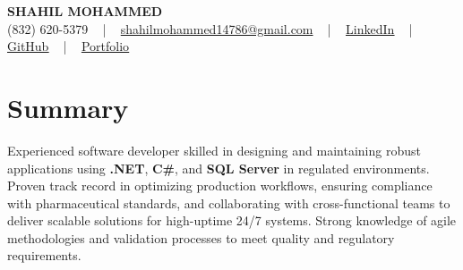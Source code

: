 \documentclass[letterpaper,10pt]{article}
\begin{document}
\begin{center}
    {\fontsize{14pt}{12pt}\selectfont \textbf{\MakeUppercase{Shahil Mohammed}}}\\ \vspace{2pt}
    \fontsize{10pt}{12pt}\selectfont (832) 620-5379 ~ | ~ \href{mailto:shahilmohammed14786@gmail.com}{shahilmohammed14786@gmail.com} ~ | ~  
    \href{https://www.linkedin.com/in/shahil-mohammed-9652931a1/}{\color{blue}\underline{LinkedIn}}  ~ | ~ 
    \href{https://github.com/freakbeast14}{\color{blue}\underline{GitHub}} ~ | ~ 
    \href{https://shahil-mohammed.netlify.app/}{\color{blue}\underline{Portfolio}}
    \vspace{-8pt}
\end{center}

\section{Summary}
\vspace{-2pt}\fontsize{8pt}{9pt}\selectfont
Experienced software developer skilled in designing and maintaining robust applications using \textbf{.NET}, \textbf{C\#}, and \textbf{SQL Server} in regulated environments. Proven track record in optimizing production workflows, ensuring compliance with pharmaceutical standards, and collaborating with cross-functional teams to deliver scalable solutions for high-uptime 24/7 systems. Strong knowledge of agile methodologies and validation processes to meet quality and regulatory requirements.
 \vspace{-5pt}
 
\vspace{-2pt}
\end{document}
